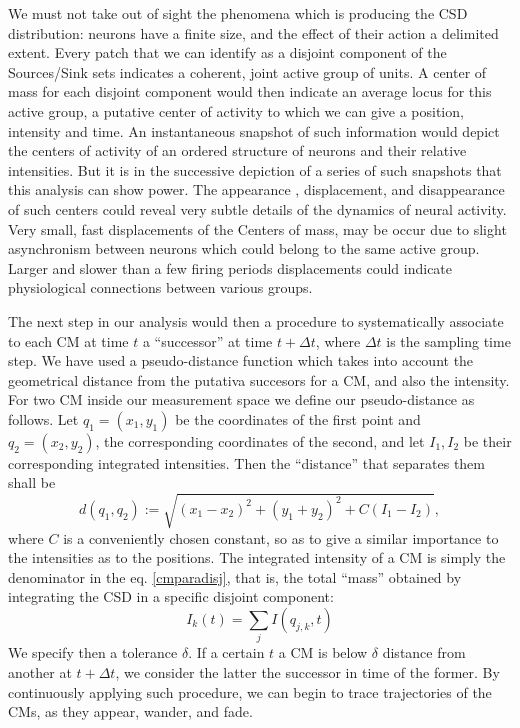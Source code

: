 \documentclass{article}
\begin{document}
We must not take out of sight the phenomena which is producing the CSD distribution: neurons have a finite size, and the effect of their action a delimited extent. Every patch that we can identify as a disjoint component of the Sources/Sink sets indicates a coherent, joint active group of units. A center of mass for each disjoint component would then indicate an average locus for this active group, a putative center of activity to which we can give a position, intensity and time. An instantaneous snapshot of such information would depict the centers of activity of an ordered structure of neurons and their relative intensities. But it is in the successive depiction of a series of such snapshots that this analysis can show power. The appearance , displacement, and disappearance of such centers could reveal very subtle details of the dynamics of neural activity. Very small, fast displacements of the Centers of mass, may be occur due to slight asynchronism between neurons which could belong to the same active group. Larger and  slower than a few firing periods displacements could indicate physiological connections between various groups.

The next step in our analysis would then a procedure to systematically associate to each CM at time $t$ a ``successor'' at time $t+\Delta t$, where $\Delta t$ is the sampling time step. We have used a pseudo-distance function which takes into account the geometrical distance from the putativa succesors for a CM, and also the intensity. For two CM inside our measurement space we define our pseudo-distance as follows. Let $q_1=(x_1, y_1)$ be the coordinates of the first point and $q_2=(x_2,y_2)$, the corresponding coordinates of the second, and let $I_1, I_2$ be their corresponding integrated intensities. Then the ``distance'' that separates them shall be 
\begin{equation}\label{pseudodist}
d(q_1,q_2):=\sqrt{(x_1-x_2)^2+(y_1+y_2)^2+C(I_1-I_2)},
\end{equation}
where $C$ is a conveniently chosen constant, so as to give a similar importance to the intensities as to the positions.
The integrated intensity of a CM is simply the denominator in the eq. \ref{cmparadisj}, that is, the total ``mass'' obtained by integrating the CSD in a specific disjoint component:
\begin{equation}
I_k(t)=\sum_j I (q_{j,k}, t)
\end{equation}
We specify then a tolerance $\delta$. If a certain $t$ a CM is below $\delta$ distance from another at $t+\Delta t$, we consider the latter the successor in time of the former. By continuously applying such procedure, we can begin to trace trajectories of the CMs, as they appear, wander, and fade. 
\end{document}
